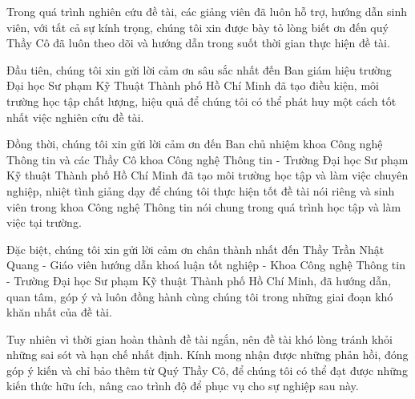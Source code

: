 \thispagestyle{fancy}
Trong quá trình nghiên cứu đề tài, các giảng viên đã luôn hỗ trợ, hướng dẫn sinh viên, với tất cả sự kính trọng, chúng tôi xin được bày tỏ lòng biết ơn đến quý Thầy Cô đã luôn theo dõi và hướng dẫn trong suốt thời gian thực hiện đề tài.

Đầu tiên, chúng tôi xin gửi lời cảm ơn sâu sắc nhất đến Ban giám hiệu trường Đại học Sư phạm Kỹ Thuật Thành phố Hồ Chí Minh đã tạo điều kiện, môi trường học tập chất lượng, hiệu quả để chúng tôi có thể phát huy một cách tốt nhất việc nghiên cứu đề tài.

Đồng thời, chúng tôi xin gửi lời cảm ơn đến Ban chủ nhiệm khoa Công nghệ Thông tin và các Thầy Cô khoa Công nghệ Thông tin - Trường Đại học Sư phạm Kỹ thuật Thành phố Hồ Chí Minh đã tạo môi trường học tập và làm việc chuyên nghiệp, nhiệt tình giảng dạy để chúng tôi thực hiện tốt đề tài nói riêng và sinh viên trong khoa Công nghệ Thông tin nói chung trong quá trình học tập và làm việc tại trường.

Đặc biệt, chúng tôi xin gửi lời cảm ơn chân thành nhất đến Thầy Trần Nhật Quang - Giáo viên hướng dẫn khoá luận tốt nghiệp - Khoa Công nghệ Thông tin - Trường Đại học Sư phạm Kỹ thuật Thành phố Hồ Chí Minh, đã hướng dẫn, quan tâm, góp ý và luôn đồng hành cùng chúng tôi trong những giai đoạn khó khăn nhất của đề tài.

Tuy nhiên vì thời gian hoàn thành đề tài ngắn, nên đề tài khó lòng tránh khỏi những sai sót và hạn chế nhất định. Kính mong nhận được những phản hồi, đóng góp ý kiến và chỉ bảo thêm từ Quý Thầy Cô, để chúng tôi có thể đạt được những kiến thức hữu ích, nâng cao trình độ để phục vụ cho sự nghiệp sau này.
